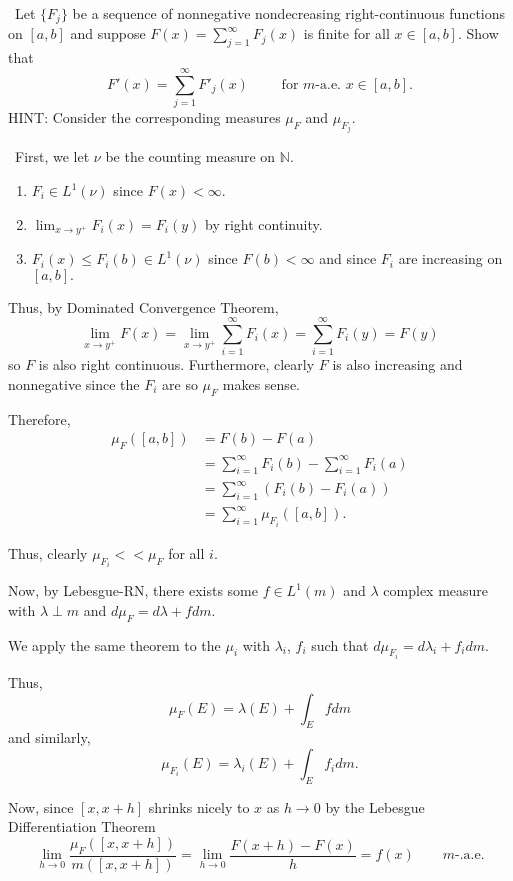 \documentclass[12pt]{Qual}
\begin{document}
\begin{problem} $\,$
Let $\{F_j\}$ be a sequence of nonnegative nondecreasing right-continuous functions on $[a,b]$ and suppose $F(x)=\sum_{j=1}^\infty F_j(x)$ is finite for all $x\in[a,b]$. Show that $$F'(x)=\sum_{j=1}^\infty F'_j(x)\qquad\text{ for }m\text{-a.e. }x\in[a,b].$$ HINT: Consider the corresponding measures $\mu_F$ and $\mu_{F_j}$.
\end{problem}


\begin{solution}$\,$
First, we let $\nu$ be the counting measure on $\mathbb{N}$.
\begin{enumerate}
    \item $F_i\in L^1(\nu)$ since $F(x)<\infty.$
    \item $\displaystyle \lim_{x\to y^+}F_i(x)=F_i(y)$ by right continuity.
    \item $F_i(x)\le F_i(b)\in L^1(\nu)$ since $F(b)<\infty$ and since $F_i$ are increasing on $[a,b].$
\end{enumerate}

Thus, by Dominated Convergence Theorem, $$\lim_{x\to y^+}F(x)=\lim_{x\to y^+}\sum_{i=1}^\infty F_i(x)=\sum_{i=1}^\infty F_i(y)=F(y)$$ so $F$ is also right continuous. Furthermore, clearly $F$ is also increasing and nonnegative since the $F_i$ are so $\mu_F$ makes sense.

Therefore, \begin{align*}
    \mu_F([a,b])&=F(b)-F(a)\\
    &=\sum_{i=1}^\infty F_i(b)-\sum_{i=1}^\infty F_i(a)\\
    &=\sum_{i=1}^\infty(F_i(b)-F_i(a))\\
    &=\sum_{i=1}^\infty\mu_{F_i}([a,b]).
\end{align*}

Thus, clearly $\mu_{F_i}<<\mu_F$ for all $i$.

Now, by Lebesgue-RN, there exists some $f\in L^1(m)$ and $\lambda$ complex measure with $\lambda\perp m$ and $d\mu_F=d\lambda+fdm.$

We apply the same theorem to the $\mu_i$ with $\lambda_i$, $f_i$ such that $d\mu_{F_i}=d\lambda_i +f_idm$.

Thus, $$\mu_F(E)=\lambda(E)+\int_Efdm$$ and similarly, $$\mu_{F_i}(E)=\lambda_i(E)+\int_Ef_idm.$$

Now, since $[x,x+h]$ shrinks nicely to $x$ as $h\to0$ by the Lebesgue Differentiation Theorem $$\lim_{h\to0}\frac{\mu_F([x,x+h])}{m([x,x+h])}=\lim_{h\to0}\frac{F(x+h)-F(x)}{h}=f(x)\qquad m\text{-.a.e}.$$


\end{solution}
\end{document}
